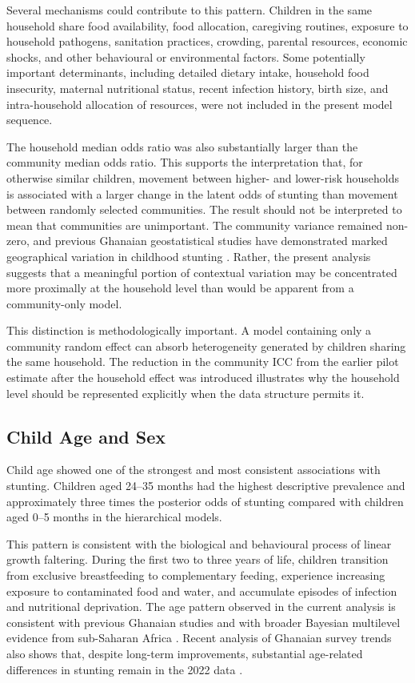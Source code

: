 Several mechanisms could contribute to this pattern. Children in the same household share food availability, food allocation, caregiving routines, exposure to household pathogens, sanitation practices, crowding, parental resources, economic shocks, and other behavioural or environmental factors. Some potentially important determinants, including detailed dietary intake, household food insecurity, maternal nutritional status, recent infection history, birth size, and intra-household allocation of resources, were not included in the present model sequence.

The household median odds ratio was also substantially larger than the community median odds ratio. This supports the interpretation that, for otherwise similar children, movement between higher- and lower-risk households is associated with a larger change in the latent odds of stunting than movement between randomly selected communities. The result should not be interpreted to mean that communities are unimportant. The community variance remained non-zero, and previous Ghanaian geostatistical studies have demonstrated marked geographical variation in childhood stunting \citep{AhetoDagne2021,AmoakoJohnson2022}. Rather, the present analysis suggests that a meaningful portion of contextual variation may be concentrated more proximally at the household level than would be apparent from a community-only model.

This distinction is methodologically important. A model containing only a community random effect can absorb heterogeneity generated by children sharing the same household. The reduction in the community ICC from the earlier pilot estimate after the household effect was introduced illustrates why the household level should be represented explicitly when the data structure permits it.

\subsection{Child Age and Sex}

Child age showed one of the strongest and most consistent associations with stunting. Children aged 24--35 months had the highest descriptive prevalence and approximately three times the posterior odds of stunting compared with children aged 0--5 months in the hierarchical models.

This pattern is consistent with the biological and behavioural process of linear growth faltering. During the first two to three years of life, children transition from exclusive breastfeeding to complementary feeding, experience increasing exposure to contaminated food and water, and accumulate episodes of infection and nutritional deprivation. The age pattern observed in the current analysis is consistent with previous Ghanaian studies and with broader Bayesian multilevel evidence from sub-Saharan Africa \citep{AhetoEtAl2015,SeworJayalakshmi2024,TakeleEtAl2022}. Recent analysis of Ghanaian survey trends also shows that, despite long-term improvements, substantial age-related differences in stunting remain in the 2022 data \citep{OsborneEtAl2025}.

